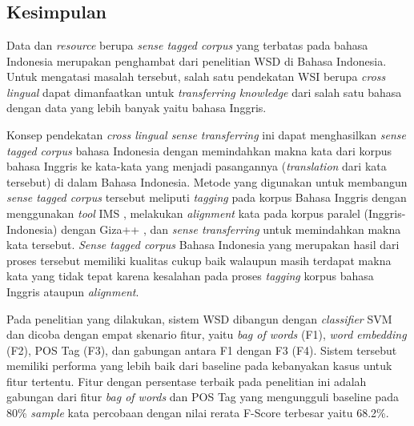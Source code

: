 \chapter{\babEnam}

\section{Kesimpulan}

Data dan \textit{resource} berupa \textit{sense tagged corpus} yang terbatas pada bahasa Indonesia merupakan penghambat dari penelitian WSD di Bahasa Indonesia. Untuk mengatasi masalah tersebut, salah satu pendekatan WSI berupa \textit{cross lingual} dapat dimanfaatkan untuk \textit{transferring knowledge} dari salah satu bahasa dengan data yang lebih banyak yaitu bahasa Inggris.

Konsep pendekatan \textit{cross lingual sense transferring} ini dapat menghasilkan \textit{sense tagged corpus} bahasa Indonesia dengan memindahkan makna kata dari korpus bahasa Inggris ke kata-kata yang menjadi pasangannya (\textit{translation} dari kata tersebut) di dalam Bahasa Indonesia. Metode yang digunakan untuk membangun \textit{sense tagged corpus} tersebut meliputi \textit{tagging} pada korpus Bahasa Inggris dengan menggunakan \textit{tool} IMS \citep{zhong2010makes}, melakukan \textit{alignment} kata pada korpus paralel (Inggris-Indonesia) dengan Giza++ \citep{och03:asc}, dan \textit{sense transferring} untuk memindahkan makna kata tersebut. \textit{Sense tagged corpus} Bahasa Indonesia  yang merupakan hasil dari proses tersebut memiliki kualitas cukup baik walaupun masih terdapat makna kata yang tidak tepat karena kesalahan pada proses \textit{tagging} korpus bahasa Inggris ataupun \textit{alignment}.

Pada penelitian yang dilakukan, sistem WSD dibangun dengan \textit{classifier} SVM dan dicoba dengan empat skenario fitur, yaitu \textit{bag of words} (F1), \textit{word embedding} (F2), POS Tag (F3), dan gabungan antara F1 dengan F3 (F4). Sistem tersebut  memiliki performa yang lebih baik dari baseline pada kebanyakan kasus untuk fitur tertentu. Fitur dengan persentase terbaik pada penelitian ini adalah gabungan dari fitur \textit{bag of words} dan POS Tag yang mengungguli baseline pada 80\% \textit{sample} kata percobaan dengan nilai rerata F-Score terbesar yaitu 68.2\%.
